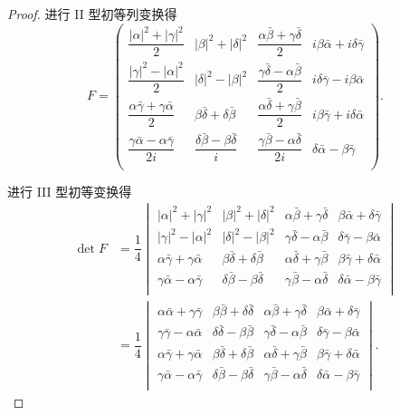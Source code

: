 \documentclass{ctexart}
\begin{document}
\begin{proof}
    进行 II 型初等列变换得
    \[F=\begin{pmatrix}
        \dfrac{|\alpha|^2+|\gamma|^2}{2} & |\beta|^2+|\delta|^2 & \dfrac{\alpha\bar{\beta}+\gamma\bar{\delta}}{2} & i\beta\bar{\alpha}+i\delta\bar{\gamma} \\[8pt]
        \dfrac{|\gamma|^2-|\alpha|^2}{2} & |\delta|^2-|\beta|^2 & \dfrac{\gamma\bar{\delta}-\alpha\bar{\beta}}{2} & i\delta\bar{\gamma}-i\beta\bar{\alpha} \\[8pt]
        \dfrac{\alpha\bar{\gamma}+\gamma\bar{\alpha}}{2} & \beta\bar{\delta}+\delta\bar{\beta} & \dfrac{\alpha\bar{\delta}+\gamma\bar{\beta}}{2} & i\beta\bar{\gamma}+i\delta\bar{\alpha} \\[8pt]
        \dfrac{\gamma\bar{\alpha}-\alpha\bar{\gamma}}{2i} & \dfrac{\delta\bar{\beta}-\beta\bar{\delta}}{i} & \dfrac{\gamma\bar{\beta}-\alpha\bar{\delta}}{2i} & \delta\bar{\alpha}-\beta\bar{\gamma} \\[8pt]
    \end{pmatrix}.\]

    进行 III 型初等变换得
    \begin{align*}
        \det F & =\dfrac{1}{4}\begin{vmatrix}
            |\alpha|^2+|\gamma|^2 & |\beta|^2+|\delta|^2 & \alpha\bar{\beta}+\gamma\bar{\delta} & \beta\bar{\alpha}+\delta\bar{\gamma} \\
            |\gamma|^2-|\alpha|^2 & |\delta|^2-|\beta|^2 & \gamma\bar{\delta}-\alpha\bar{\beta} & \delta\bar{\gamma}-\beta\bar{\alpha} \\
            \alpha\bar{\gamma}+\gamma\bar{\alpha} & \beta\bar{\delta}+\delta\bar{\beta} & \alpha\bar{\delta}+\gamma\bar{\beta} & \beta\bar{\gamma}+\delta\bar{\alpha} \\
            \gamma\bar{\alpha}-\alpha\bar{\gamma} & \delta\bar{\beta}-\beta\bar{\delta} & \gamma\bar{\beta}-\alpha\bar{\delta} & \delta\bar{\alpha}-\beta\bar{\gamma} \\
        \end{vmatrix} \\
        & =\dfrac{1}{4}\begin{vmatrix}
            \alpha\bar{\alpha}+\gamma\bar{\gamma} & \beta\bar{\beta}+\delta\bar{\delta} & \alpha\bar{\beta}+\gamma\bar{\delta} & \beta\bar{\alpha}+\delta\bar{\gamma} \\
            \gamma\bar{\gamma}-\alpha\bar{\alpha} & \delta\bar{\delta}-\beta\bar{\beta} & \gamma\bar{\delta}-\alpha\bar{\beta} & \delta\bar{\gamma}-\beta\bar{\alpha} \\
            \alpha\bar{\gamma}+\gamma\bar{\alpha} & \beta\bar{\delta}+\delta\bar{\beta} & \alpha\bar{\delta}+\gamma\bar{\beta} & \beta\bar{\gamma}+\delta\bar{\alpha} \\
            \gamma\bar{\alpha}-\alpha\bar{\gamma} & \delta\bar{\beta}-\beta\bar{\delta} & \gamma\bar{\beta}-\alpha\bar{\delta} & \delta\bar{\alpha}-\beta\bar{\gamma} \\
        \end{vmatrix}.
    \end{align*}


\end{proof}
\end{document}
